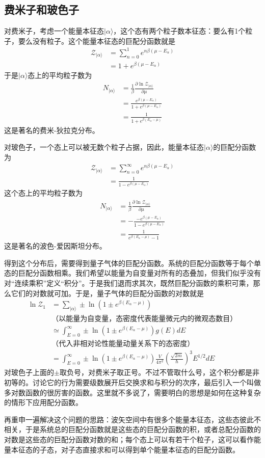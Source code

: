 \documentclass[a4paper,11pt]{ctexart}
\newcommand{\bea}{\begin{equation}\begin{aligned}}
\newcommand{\eea}{\end{aligned}\end{equation}}
\newcommand{\grandz}{\mathcal{Z}}
\begin{document}
\subsection{费米子和玻色子}
对费米子，考虑一个能量本征态$|\alpha \rangle$，这个态有两个粒子数本征态：要么有1个粒子，要么没有粒子。这个能量本征态的巨配分函数就是
\bea
\grandz_{|\alpha \rangle} &= \sum_{n=0}^1 e^{n\beta(\mu - E_\alpha)} \\
&= 1+ e^{\beta(\mu - E_\alpha)}
\eea
于是$|\alpha \rangle$态上的平均粒子数为
\bea
N_{|\alpha \rangle} &= \frac{1}{\beta} \frac{\partial \ln \grandz_{|\alpha \rangle}}{\partial \mu} \\
&=\frac{e^{\beta(\mu - E_\alpha)}}{1+e^{\beta(\mu - E_\alpha)}} \\
&= \frac{1}{1+e^{\beta(E_\alpha - \mu)}}
\eea
这是著名的费米-狄拉克分布。
\par
对玻色子，一个态上可以被无数个粒子占据，因此，能量本征态$|\alpha \rangle$的巨配分函数为
\bea
\grandz_{|\alpha \rangle} &= \sum_{n=0}^\infty e^{n\beta(\mu - E_\alpha)} \\
&= \frac{1}{1- e^{\beta(\mu - E_\alpha)}}
\eea
这个态上的平均粒子数为
\bea
N_{|\alpha \rangle} &= \frac{1}{\beta} \frac{\partial \ln \grandz_{|\alpha \rangle}}{\partial \mu} \\
&=-\frac{-e^{\beta(\mu - E_\alpha)}}{1-e^{\beta(\mu - E_\alpha)}} \\
&= \frac{1}{ e^{\beta(E_\alpha - \mu)} - 1}
\eea
这是著名的波色-爱因斯坦分布。
\par
得到这个分布后，需要得到量子气体的巨配分函数。系统的巨配分函数等于每个单态的巨配分函数相乘。我们希望以能量为自变量对所有的态叠加，但我们似乎没有对“连续乘积”定义“积分”。于是我们退而求其次，既然巨配分函数的乘积可乘，那么它们的对数就可加。于是，量子气体的巨配分函数的对数就是
\bea
\ln \grandz_1 &= \sum_{|\alpha \rangle}\pm \ln (1 \pm e^{\beta(E_\alpha - \mu)}) \\
&\text{（以能量为自变量，态密度代表能量微元内的微观态数目）} \\
&\simeq \int_{E=0}^\infty \pm \ln (1 \pm e^{\beta(E_\alpha - \mu)})g(E)dE \\
& \text{（代入非相对论性能量动量关系下的态密度）} \\
&=\int_{E=0}^\infty \pm \ln (1 \pm e^{\beta(E_\alpha - \mu)})\frac{V}{4\pi^2} (\frac{\sqrt{2m}}{\hbar})^3 E^{1/2} dE
\eea
对玻色子上面的$\pm$取负号，对费米子取正号。不过不管取什么号，这个积分都是非初等的。讨论它的行为需要级数展开后交换求和与积分的次序，最后引入一个叫做多对数函数的很厉害的函数。这里就不多说了，需要明白的思想是如何在这种复杂的情形下应用配分函数。
\par
再重申一遍解决这个问题的思路：波矢空间中有很多个能量本征态，这些态彼此不相关，于是系统总的巨配分函数就是这些态的巨配分函数的积，或者总配分函数的对数是这些态的巨配分函数对数的和；每个态上可以有若干个粒子，这可以看作能量本征态的子态，对子态直接求和可以得到单个能量本征态的巨配分函数。
\end{document}
